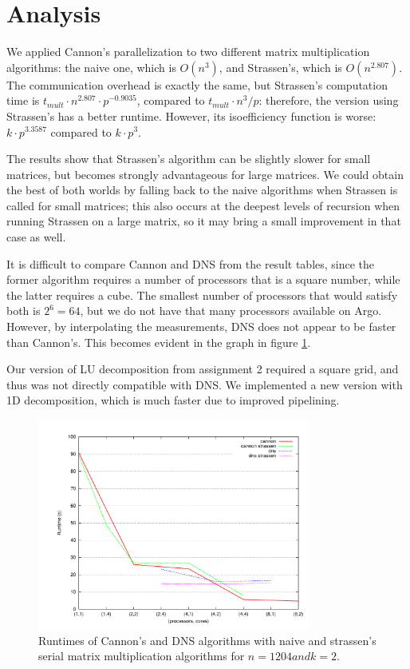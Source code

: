\documentclass{article}
\begin{document}


\section{Analysis}

We applied Cannon's parallelization to two different matrix multiplication algorithms: the naive one, which is $O(n^3)$, and Strassen's, which is $O(n^{2.807})$. The communication overhead is exactly the same, but Strassen's computation time is $t_{{mult}} \cdot n^{2.807} \cdot  p^{-0.9035}$, compared to $t_{mult} \cdot n^3 / p$: therefore, the version using Strassen's has a better runtime. However, its isoefficiency function is worse: $k \cdot p^{3.3587}$ compared to $k \cdot p^3$.

The results show that Strassen's algorithm can be slightly slower for small matrices, but becomes strongly advantageous for large matrices. We could obtain the best of both worlds by falling back to the naive algorithms when Strassen is called for small matrices; this also occurs at the deepest levels of recursion when running Strassen on a large matrix, so it may bring a small improvement in that case as well.

It is difficult to compare Cannon and DNS from the result tables, since the former algorithm requires a number of processors that is a square number, while the latter requires a cube. The smallest number of processors that would satisfy both is $2^6 = 64$, but we do not have
 that many processors available on Argo. However, by interpolating the measurements, DNS does not appear to be faster than Cannon's. This becomes evident in the graph in figure \ref{fig:cannon-dns}.

Our version of LU decomposition from assignment 2 required a square grid, and thus was not directly compatible with DNS. We implemented a new version with
1D decomposition, which is much faster due to improved pipelining.


\begin{figure}
	\centering
	\includegraphics[width=0.8\textwidth]{images/finished/cannon-dns-1024-2.pdf}
    \caption{Runtimes of Cannon's and DNS algorithms with naive and strassen's serial matrix multiplication algorithms for $n = 1204 and k = 2$.}
    \label{fig:cannon-dns}
\end{figure}
\end{document}
